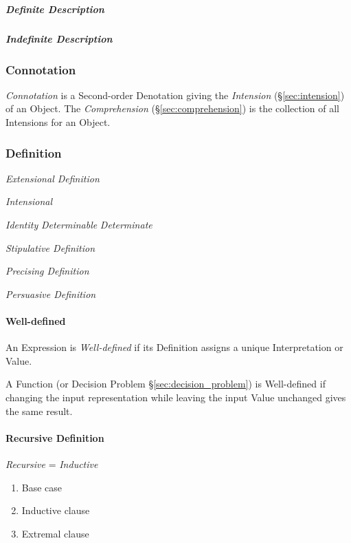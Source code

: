 \subparagraph{Definite Description}\label{sec:definite_description}\hfill

\subparagraph{Indefinite Description}\label{sec:indefinite_description}\hfill



\subsubsection{Connotation}\label{sec:connotation}

\emph{Connotation} is a Second-order Denotation giving the
\emph{Intension} (\S\ref{sec:intension}) of an Object. The
\emph{Comprehension} (\S\ref{sec:comprehension}) is the collection of
all Intensions for an Object.



\subsubsection{Definition}\label{sec:definition}

\emph{Extensional Definition}

\emph{Intensional}

\emph{Identity} \emph{Determinable} \emph{Determinate}

\emph{Stipulative Definition}

\emph{Precising Definition}

\emph{Persuasive Definition}



\paragraph{Well-defined}\label{sec:well_defined}\hfill

An Expression is \emph{Well-defined} if its Definition assigns a
unique Interpretation or Value.

A Function (or Decision Problem \S\ref{sec:decision_problem}) is
Well-defined if changing the input representation while leaving the
input Value unchanged gives the same result. %



\paragraph{Recursive Definition}\label{sec:recursive_definition}\hfill

\emph{Recursive} = \emph{Inductive}

\begin{enumerate}
    \item Base case
    \item Inductive clause
    \item Extremal clause
\end{enumerate}

